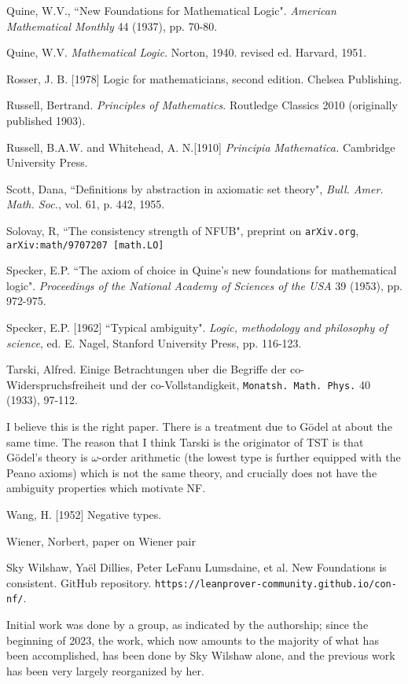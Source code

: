 \documentclass{article}
\theoremstyle{definition}
\theoremstyle{remark}
\begin{document}
\begin{thebibliography}{99}
  Quine, W.V.,
``New Foundations for Mathematical Logic".
{\em American Mathematical Monthly\/} 44 (1937), pp. 70-80.

  Quine, W.V.  {\em Mathematical Logic\/}.  Norton, 1940.  revised ed. Harvard, 1951.

  Rosser, J. B. [1978]
Logic for mathematicians, second edition.
Chelsea Publishing.

  Russell, Bertrand.  {\em Principles of Mathematics\/}.  Routledge Classics 2010 (originally published 1903).

  Russell, B.A.W. and Whitehead, A. N.[1910]
{\em Principia Mathematica.\/} Cambridge University Press.

  Scott, Dana, ``Definitions by abstraction in axiomatic set theory",  {\em Bull. Amer. Math.
Soc.}, vol. 61, p. 442, 1955.

  Solovay, R, ``The consistency strength of NFUB",  preprint on {\tt arXiv.org}, {\tt arXiv:math/9707207 [math.LO]}

  Specker, E.P.
``The axiom of choice in Quine's new foundations for mathematical logic".
{\em Proceedings of the National Academy of Sciences of the USA\/} 39 (1953), pp. 972-975.

  Specker, E.P. [1962]
``Typical ambiguity".
{\em Logic, methodology and philosophy of science\/}, ed. E. Nagel, Stanford University Press, pp. 116-123.

  Tarski, Alfred.  Einige Betrachtungen uber die Begriffe der co-Widerspruchsfreiheit und der co-Vollstandigkeit,
{\tt Monatsh. Math. Phys.\/} 40 (1933), 97-112.

I believe this is the right paper.  There is a treatment due to G\"odel at about the same time.  The reason that I think Tarski is the originator of TST is that G\"odel's theory is $\omega$-order arithmetic (the lowest type is further equipped with the Peano axioms) which is not the same theory, and crucially does not have the ambiguity properties which motivate NF.

  Wang, H. [1952]
Negative types.

  Wiener, Norbert, paper on Wiener pair

  Sky Wilshaw, Yaël Dillies, Peter LeFanu Lumsdaine, et al. New Foundations is consistent. GitHub repository. {\tt https://leanprover-community.github.io/con-nf/}.

Initial work was done by a group, as indicated by the authorship;  since the beginning of 2023, the work, which now amounts to the majority of what has been accomplished, has been done by Sky Wilshaw alone, and the previous work has been very largely reorganized by her.


\end{thebibliography}
\end{document}
